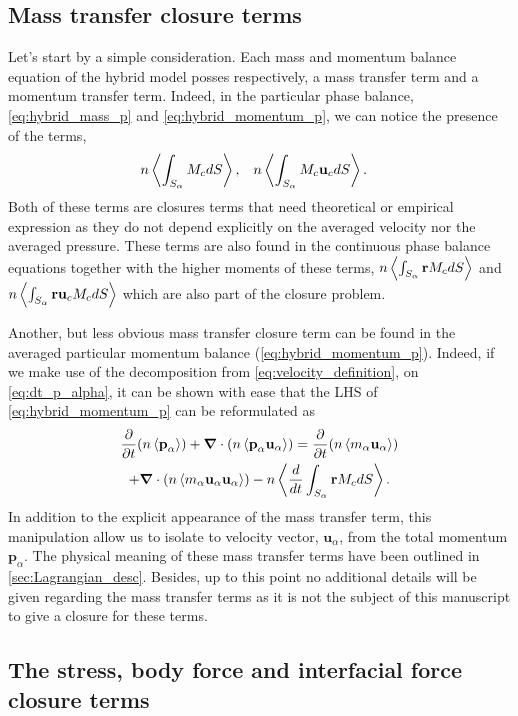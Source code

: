 \subsection{Mass transfer closure terms}

Let's start by a simple consideration. 
Each mass and momentum balance equation of the hybrid model posses respectively, a mass transfer term and a momentum transfer term. 
Indeed, in the particular phase balance, \ref{eq:hybrid_mass_p} and \ref{eq:hybrid_momentum_p}, we can notice the presence of the terms,
\begin{equation*}
    n \left<\int_{S_\alpha} M_c dS\right>,  \;\;\;
    n \left<\int_{S_\alpha} M_c \textbf{u}_c dS\right>.  \;\;\;
\end{equation*}
Both of these terms are closures terms that need theoretical or empirical expression as they do not depend explicitly on the averaged velocity nor the averaged pressure. 
These terms are also found in the continuous phase balance equations together with the higher moments of these terms, $n \left<\int_{S_\alpha} \textbf{r} M_c dS\right>$ and $n \left<\int_{S_\alpha} \textbf{r}  \textbf{u}_c M_c dS\right>$ which are also part of the closure problem. 

Another, but less obvious mass transfer closure term can be found in the averaged particular momentum balance (\ref{eq:hybrid_momentum_p}). 
Indeed, if we make use of the decomposition from \ref{eq:velocity_definition}, on \ref{eq:dt_p_alpha},  it  can be shown with ease that the LHS of \ref{eq:hybrid_momentum_p} can be reformulated as  
\begin{multline}
    \frac{\partial}{\partial t}   (n \left<\textbf{p}_\alpha\right>)
    + \bm{\nabla} \cdot (n \left<\textbf{p}_\alpha \textbf{u}_\alpha\right>) 
    = \frac{\partial}{\partial t} (n \left<m_\alpha\textbf{u}_\alpha\right>) \\
    + \bm{\nabla} \cdot (n \left<m_\alpha \textbf{u}_\alpha \textbf{u}_\alpha\right>)
    - n \left<\frac{d}{d t} \int_{S_\alpha} \textbf{r} M_c dS\right>.
    \label{eq:advection_term_eq}
\end{multline}
In addition to the explicit appearance of the mass transfer term, this manipulation allow us to isolate to velocity vector, $\textbf{u}_\alpha$, from the total momentum $\textbf{p}_\alpha$. 
The physical meaning of these mass transfer terms have been outlined in \ref{sec:Lagrangian_desc}.
Besides, up to this point no additional details will be  given regarding the mass transfer terms as it is not the subject  of this manuscript to give a closure for these terms. 

\subsection{The stress, body force and interfacial force closure terms}

